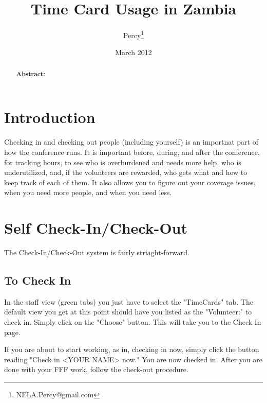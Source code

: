 \documentclass[captions=tablesignature]{scrartcl}
\author{Percy\thanks{NELA.Percy@gmail.com}}
\date{March 2012}
\title{Time Card Usage in Zambia}
\begin{document}
\maketitle
{}
\thispagestyle{fancy}
\renewcommand{\headrulewidth}{0pt}
\renewcommand{\footrulewidth}{0pt}
\lhead{}
\rhead{}
\chead{}
\lfoot{}
\cfoot{}
\rfoot{}
\begin{abstract}
\vspace{5cm}
{\LARGE{\textbf{Abstract:\\}}}

\end{abstract}
\newpage
\renewcommand{\headrulewidth}{1pt}
\renewcommand{\footrulewidth}{1pt}
\rfoot{\thepage}
\setcounter{tocdepth}{3}
\tableofcontents
\newpage
{}
\section{Introduction}
\label{sec-1}

Checking in and checking out people (including yourself) is an
importnat part of how the conference runs.  It is important before,
during, and after the conference, for tracking hours, to see who is
overburdened and needs more help, who is underutilized, and, if the
volunteers are rewarded, who gets what and how to keep track of each
of them.  It also allows you to figure out your coverage issues,
when you need more people, and when you need less.
\section{Self Check-In/Check-Out}
\label{sec-2}

The Check-In/Check-Out system is fairly striaght-forward.  
\subsection{To Check In}
\label{sec-2-1}
In the staff view (green tabs) you just have to select the
"TimeCards" tab.  The default view you get at this point should
have you listed as the "Volunteer:" to check in.  Simply click on
the "Choose" button.  This will take you to the Check In page.

If you are about to start working, as in, checking in now, simply
click the button reading "Check in <YOUR NAME> now."  You are now
checked in.  After you are done with your FFF work, follow the
check-out procedure.
\end{document}
